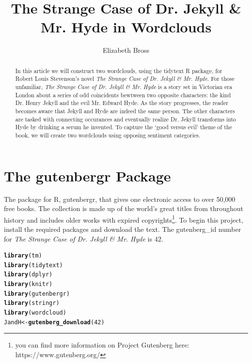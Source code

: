 \documentclass{article}\usepackage[]{graphicx}\usepackage[]{color}
\makeatletter
\newcommand{\hlnum}[1]{\textcolor[rgb]{0.686,0.059,0.569}{#1}}%
\newcommand{\hlstd}[1]{\textcolor[rgb]{0.345,0.345,0.345}{#1}}%
\newcommand{\hlkwb}[1]{\textcolor[rgb]{0.69,0.353,0.396}{#1}}%
\newcommand{\hlkwd}[1]{\textcolor[rgb]{0.737,0.353,0.396}{\textbf{#1}}}%
\newenvironment{kframe}{%
 \def\at@end@of@kframe{}%
 \ifinner\ifhmode%
  \def\at@end@of@kframe{\end{minipage}}%
  \begin{minipage}{\columnwidth}%
 \fi\fi%
 \def\FrameCommand##1{\hskip\@totalleftmargin \hskip-\fboxsep
 \colorbox{shadecolor}{##1}\hskip-\fboxsep
     \hskip-\linewidth \hskip-\@totalleftmargin \hskip\columnwidth}%
 \MakeFramed {\advance\hsize-\width
   \@totalleftmargin\z@ \linewidth\hsize
   \@setminipage}}%
 {\par\unskip\endMakeFramed%
 \at@end@of@kframe}
\newenvironment{knitrout}{}{} %
\makeatother
\begin{document}
\title{The Strange Case of Dr. Jekyll \& Mr. Hyde in Wordclouds}
\author{Elizabeth Bross}
\maketitle

\begin{abstract}

In this article we will construct two wordclouds, using the tidytext R package, for Robert Louis Stevenson's novel \textit{The Strange Case of Dr. Jekyll \& Mr. Hyde}. For those unfamiliar, \textit{The Strange Case of Dr. Jekyll \& Mr. Hyde} is a story set in Victorian era London about a series of odd coincidents bewtween two opposite characters: the kind Dr. Henry Jekyll and the evil Mr. Edward Hyde. As the story progresses, the reader becomes aware that Jekyll and Hyde are indeed the same person. The other characters are tasked with connecting occurances and eventually realize Dr. Jekyll transforms into Hyde by drinking a serum he invented. To capture the `good versus evil' theme of the book, we will create two wordclouds using opposing sentiment categories.

\end{abstract}

\section{The gutenbergr Package}
The package for R, gutenbergr, that gives one electronic access to over 50,000 free books. The collection is made up of the world's great titles from throughout history and includes older works with expired copyrights\footnote{you can find more information on Project Gutenberg here:  https://www.gutenberg.org/}. To begin this project, install the required packages and download the text. The gutenberg\_id number for \textit{The Strange Case of Dr. Jekyll \& Mr. Hyde} is 42. 

\begin{knitrout}
\color{fgcolor}\begin{kframe}
\begin{alltt}
\hlkwd{library}\hlstd{(tm)}
\hlkwd{library}\hlstd{(tidytext)}
\hlkwd{library}\hlstd{(dplyr)}
\hlkwd{library}\hlstd{(knitr)}
\hlkwd{library}\hlstd{(gutenbergr)}
\hlkwd{library}\hlstd{(stringr)}
\hlkwd{library}\hlstd{(wordcloud)}
\hlstd{JandH}\hlkwb{<-}\hlkwd{gutenberg_download}\hlstd{(}\hlnum{42}\hlstd{)}
\end{alltt}
\end{kframe}
\end{knitrout}
\end{document}
